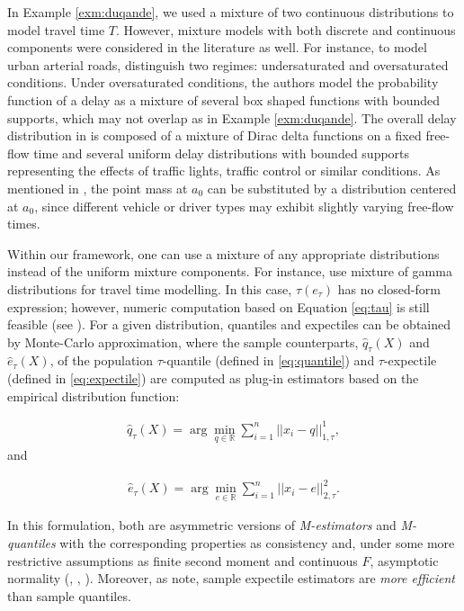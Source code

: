 \documentclass[preprint, 3p, authoryear]{elsarticle} %
\theoremstyle{definition}
\theoremstyle{definition}
\theoremstyle{definition}
\theoremstyle{definition}
\theoremstyle{remark}
\begin{document}
In Example \ref{exm:duqande}, we used a mixture of two continuous distributions to model travel time \(T\). However, mixture models with both discrete and continuous components were considered in the literature as well. For instance, to model urban arterial roads, \citet{zheng_fangfang2017} distinguish two regimes: undersaturated and oversaturated conditions. Under oversaturated conditions, the authors model the probability function of a delay as a mixture of several box shaped functions with bounded supports, which may not overlap as in Example \ref{exm:duqande}. The overall delay distribution in \citet{zheng_fangfang2017} is composed of a mixture of Dirac delta functions on a fixed free-flow time and several uniform delay distributions with bounded supports representing the effects of traffic lights, traffic control or similar conditions. As mentioned in \citet{zheng_fangfang2017}, the point mass at \(a_0\) can be substituted by a distribution centered at \(a_0\), since different vehicle or driver types may exhibit slightly varying free-flow times.

Within our framework, one can use a mixture of any appropriate distributions instead of the uniform mixture components. For instance, \citet{jabari2019} use mixture of gamma distributions for travel time modelling. In this case, \(\tau(e_\tau)\) has no closed-form expression; however, numeric computation based on Equation \eqref{eq:tau} is still feasible (see \citet{daouia_etal24}). For a given distribution, quantiles and expectiles can be obtained by Monte-Carlo approximation, where the sample counterparts, \(\hat q_\tau(X)\) and \(\hat e_\tau(X)\), of the population \(\tau\)-quantile (defined in \eqref{eq:quantile}) and \(\tau\)-expectile (defined in \eqref{eq:expectile}) are computed as plug-in estimators based on the empirical distribution function:

\begin{align}
\hat q_\tau(X) = \arg\min_{q\in\mathbb R}\sum_{i=1}^n||x_i-q||^1_{1,\tau}, \label{eq:q}
\end{align}
and

\begin{align}
\hat e_\tau(X) = \arg\min_{e\in\mathbb R}\sum_{i=1}^n||x_i-e||^2_{2,\tau}. \label{eq:e}
\end{align}

In this formulation, both are asymmetric versions of \emph{M-estimators} and \emph{M-quantiles} with the corresponding properties as consistency and, under some more restrictive assumptions as finite second moment and continuous \(F\), asymptotic normality (\citet{holzmann2016}, \citet{abdous1995}, \citet{breckling1988}). Moreover, as \citet{abdous1995} note, sample expectile estimators are \emph{more efficient} than sample quantiles.
\end{document}
